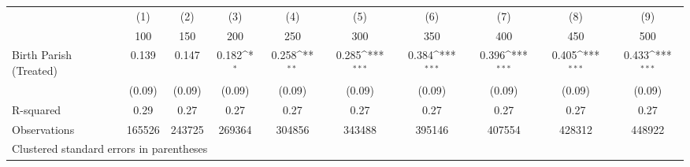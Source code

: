 {
\def\sym#1{\ifmmode^{#1}\else\(^{#1}\)\fi}
\begin{tabular}{l*{9}{c}}
\hline\hline
                    &\multicolumn{1}{c}{(1)}&\multicolumn{1}{c}{(2)}&\multicolumn{1}{c}{(3)}&\multicolumn{1}{c}{(4)}&\multicolumn{1}{c}{(5)}&\multicolumn{1}{c}{(6)}&\multicolumn{1}{c}{(7)}&\multicolumn{1}{c}{(8)}&\multicolumn{1}{c}{(9)}\\
                    &\multicolumn{1}{c}{100}&\multicolumn{1}{c}{150}&\multicolumn{1}{c}{200}&\multicolumn{1}{c}{250}&\multicolumn{1}{c}{300}&\multicolumn{1}{c}{350}&\multicolumn{1}{c}{400}&\multicolumn{1}{c}{450}&\multicolumn{1}{c}{500}\\
\hline
Birth Parish (Treated)&       0.139         &       0.147         &       0.182\sym{*}  &       0.258\sym{**} &       0.285\sym{***}&       0.384\sym{***}&       0.396\sym{***}&       0.405\sym{***}&       0.433\sym{***}\\
                    &      (0.09)         &      (0.09)         &      (0.09)         &      (0.09)         &      (0.09)         &      (0.09)         &      (0.09)         &      (0.09)         &      (0.09)         \\
\hline
R-squared           &        0.29         &        0.27         &        0.27         &        0.27         &        0.27         &        0.27         &        0.27         &        0.27         &        0.27         \\
Observations        &      165526         &      243725         &      269364         &      304856         &      343488         &      395146         &      407554         &      428312         &      448922         \\
\hline\hline
\multicolumn{10}{l}{\footnotesize Clustered standard errors in parentheses}\\
\end{tabular}
}

